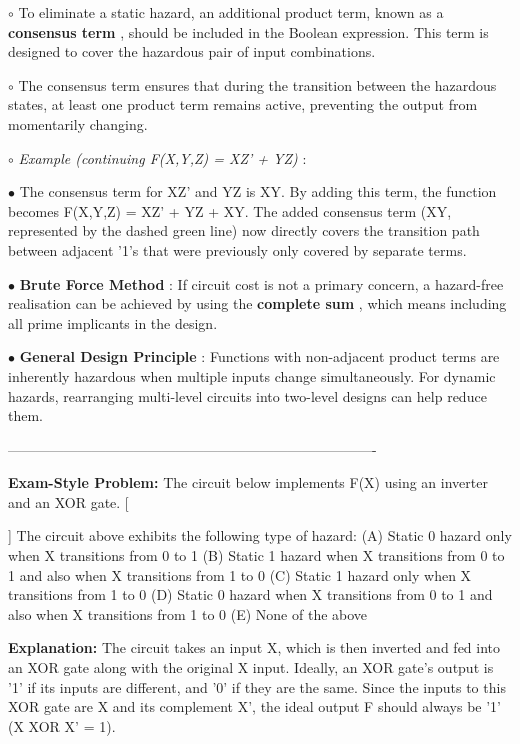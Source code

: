 \documentclass{article}
\begin{document}
\begin{itemize}
    $\circ$ To eliminate a static hazard, an additional product term, known as a \textbf{consensus term} , should be included in the Boolean expression. This term is designed to cover the hazardous pair of input combinations.

    $\circ$ The consensus term ensures that during the transition between the hazardous states, at least one product term remains active, preventing the output from momentarily changing.

    $\circ$ \textit{Example (continuing F(X,Y,Z) = XZ' + YZ)} :

        $\bullet$ The consensus term for XZ' and YZ is XY. By adding this term, the function becomes F(X,Y,Z) = XZ' + YZ + XY.  The added consensus term (XY, represented by the dashed green line) now directly covers the transition path between adjacent '1's that were previously only covered by separate terms.

$\bullet$ \textbf{Brute Force Method} : If circuit cost is not a primary concern, a hazard-free realisation can be achieved by using the \textbf{complete sum} , which means including all prime implicants in the design.

$\bullet$ \textbf{General Design Principle} : Functions with non-adjacent product terms are inherently hazardous when multiple inputs change simultaneously. For dynamic hazards, rearranging multi-level circuits into two-level designs can help reduce them.

\-------------------------------------------------------------------------------- 

\textbf{Exam-Style Problem:} The circuit below implements F(X) using an inverter and an XOR gate. [ \begin{center}  \end{center} ] The circuit above exhibits the following type of hazard: (A) Static 0 hazard only when X transitions from 0 to 1 (B) Static 1 hazard when X transitions from 0 to 1 and also when X transitions from 1 to 0 (C) Static 1 hazard only when X transitions from 1 to 0 (D) Static 0 hazard when X transitions from 0 to 1 and also when X transitions from 1 to 0 (E) None of the above

\textbf{Explanation:} The circuit takes an input X, which is then inverted and fed into an XOR gate along with the original X input. Ideally, an XOR gate's output is '1' if its inputs are different, and '0' if they are the same. Since the inputs to this XOR gate are X and its complement X', the ideal output F should always be '1' (X XOR X' = 1).


\end{itemize}
\end{document}
